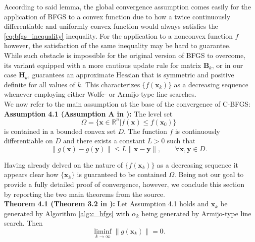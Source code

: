 \documentclass{article}
\numberwithin{equation}{section}
\begin{document}
According to said lemma, the global convergence assumption comes easily for the application of BFGS to a convex function due to how a twice continuously differentiable and uniformly convex function would always satisfies the \ref{eq:bfgs_inequality} inequality. For the application to a nonconvex function $f$ however, the satisfaction of the same inequality may be hard to guarantee.
\\

While such obstacle is impossible for the original version of BFGS to overcome, its variant equipped with a more cautious update rule for matrix $\boldsymbol{B}_k$, or in our case $\boldsymbol{H}_k$, guarantees an approximate Hessian that is symmetric and positive definite for all values of $k$. This characterizes $\{f(\boldsymbol{x}_k)\}$ as a decreasing sequence whenever employing either Wolfe- or Armijo-type line searches. \\

We now refer to the main assumption at the base of the convergence of C-BFGS:\\
\textbf{Assumption 4.1 (Assumption A in \cite{LiFukushimaA}):} The level set 
\begin{equation*}
    \Omega = \{\boldsymbol{x} \in \mathbb{R}^n | f(\boldsymbol{x}) \le f(\boldsymbol{x}_0)\}
\end{equation*}
is contained in a bounded convex set $D$. The function $f$ is continuously differentiable on $D$ and there exists a constant $L>0$ such that
\begin{equation*}
    \| g(\boldsymbol{x}) - g(\boldsymbol{y}) \| \le L \|\boldsymbol{x} - \boldsymbol{y} \|, \qquad \forall \boldsymbol{x}, \boldsymbol{y} \in D.
\end{equation*}

Having already delved on the nature of $\{f(\boldsymbol{x}_k)\}$ as a decreasing sequence it appears clear how $\{\boldsymbol{x}_k\}$ is guaranteed to be contained $\Omega$. Being not our goal to provide a fully detailed proof of convergence, however, we conclude this section by reporting the two main theorems from the source.\\  

\textbf{Theorem 4.1 (Theorem 3.2 in \cite{LiFukushimaA}):} Let Assumption 4.1 holds and {$\boldsymbol{x}_k$} be generated by Algorithm \ref{alg:c_bfgs} with $\alpha_k$ being generated by Armijo-type line search. Then 
\begin{equation}\label{c-bfgs_conv}
    \liminf_{k \rightarrow \infty} \| g(\boldsymbol{x}_k)\| = 0.
\end{equation}
\end{document}

